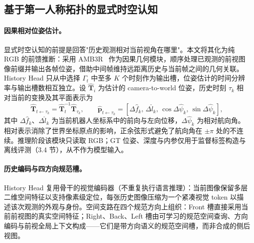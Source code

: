 \documentclass[10pt]{ctexart}
\begin{document}
\subsection{基于第一人称拓扑的显式时空认知}
\label{sec:cognition}

\paragraph{因果相对位姿估计。}
显式时空认知的前提是回答"历史观测相对当前视角在哪里"。本文将其化为纯 RGB 的前馈推断：采用 AMB3R~\cite{amb3r} 作为因果几何模块，顺序处理已观测的前视图像前缀并输出各帧位姿，借助中间帧维持远距离历史与当前帧之间的几何关联。History Head 只从中选择 $\Gamma_t$ 中至多 $K$ 个时刻作为输出槽，位姿估计的时间分辨率与输出槽数相互独立。设 $\widehat{\mathbf{T}}_i$ 为估计的 camera-to-world 位姿，历史时刻 $\tau_k$ 相对当前的变换及其平面表示为
\begin{equation}
\widehat{\mathbf{T}}_{t\leftarrow\tau_k}
=
\widehat{\mathbf{T}}_t^{-1}
\widehat{\mathbf{T}}_{\tau_k},
\qquad
\widehat{\mathbf{p}}_{t\leftarrow\tau_k}
=
\left[
\Delta\widehat f_k,\,
\Delta\widehat l_k,\,
\cos\Delta\widehat\psi_k,\,
\sin\Delta\widehat\psi_k
\right],
\label{eq:relative_pose}
\end{equation}
其中 $\Delta\widehat f_k$、$\Delta\widehat l_k$ 为当前机器人坐标系中的前向与左向位移，$\Delta\widehat\psi_k$ 为相对航向角。相对表示消除了世界坐标原点的影响，正余弦形式避免了航向角在 $\pm\pi$ 处的不连续。推理阶段该模块只读取 RGB；GT 位姿、深度与内参仅用于监督标签构造与离线评测（3.4 节），从不作为模型输入。

\paragraph{历史编码与四方向规范槽。}
History Head 复用骨干的视觉编码器（不重复执行语言推理）：当前图像保留多层二维空间特征以支持像素级定位，每张历史图像压缩为一个紧凑视觉 token 以描述该次观测的外观与身份。空间支路在四个规范方向上组织：Front 槽直接采用当前前视图的真实空间特征；Right、Back、Left 槽由可学习的规范空间查询、方向编码与前视全局上下文构成——它们是带方向语义的规范空间槽，而非合成的侧后视图。
\end{document}

